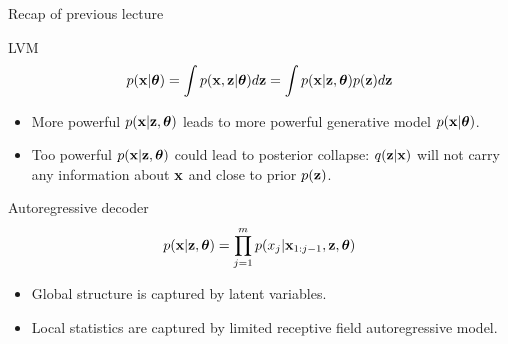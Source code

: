 

\usepackage{tikz}

\usetikzlibrary{arrows,shapes,positioning,shadows,trees}

\begin{frame}
\titlepage
\end{frame}
\begin{frame}{Recap of previous lecture}
	\begin{block}{LVM}
		\vspace{-0.3cm}
		\[
		    p(\mathbf{x} | \boldsymbol{\theta}) = \int p(\mathbf{x}, \mathbf{z} | \boldsymbol{\theta}) d \mathbf{z} = \int p(\mathbf{x} | \mathbf{z}, \boldsymbol{\theta}) p(\mathbf{z}) d \mathbf{z} 
		\]
		\vspace{-0.3cm}
	\end{block}
	\begin{itemize}
		\item More powerful $p(\mathbf{x} | \mathbf{z}, \boldsymbol{\theta})$ leads to more powerful generative model $p(\mathbf{x} | \boldsymbol{\theta})$.
		\item Too powerful $p(\mathbf{x} | \mathbf{z}, \boldsymbol{\theta})$ could lead to posterior collapse: $q(\mathbf{z} | \mathbf{x})$ will not carry any information about $\mathbf{x}$ and close to prior $p(\mathbf{z})$.
	\end{itemize}
	\begin{block}{Autoregressive decoder}
		\vspace{-0.2cm}
		\[
		    p(\mathbf{x} | \mathbf{z} , \boldsymbol{\theta}) = \prod_{j=1}^m p(x_j | \mathbf{x}_{1:j - 1}, \mathbf{z} , \boldsymbol{\theta})
		\]
	\end{block}
	\begin{itemize}
		\item Global structure is captured by latent variables.
		\item Local statistics are captured by limited receptive field autoregressive model.
	\end{itemize}
	
\end{frame}
